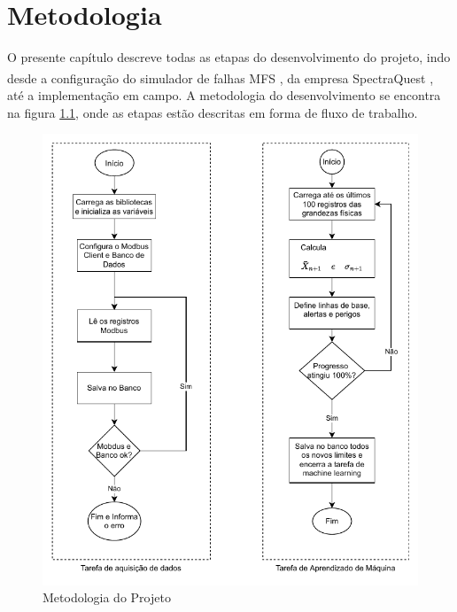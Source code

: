 
\chapter{Metodologia}

O presente capítulo descreve todas as etapas do desenvolvimento do projeto, indo desde a configuração do simulador de falhas MFS 
\textsuperscript \textregistered, da empresa SpectraQuest \textsuperscript \textregistered, até a implementação em campo. A metodologia do
desenvolvimento se encontra na figura \ref{fig:metodologia}, onde as etapas estão descritas em forma de fluxo de trabalho.

\begin{figure}[H]
    \caption{Metodologia do Projeto}
    \begin{center}
        \includegraphics[scale=1.1, page=3]{metodologia/img/software.pdf}
    \end{center}
    \label{fig:metodologia}
\end{figure}

